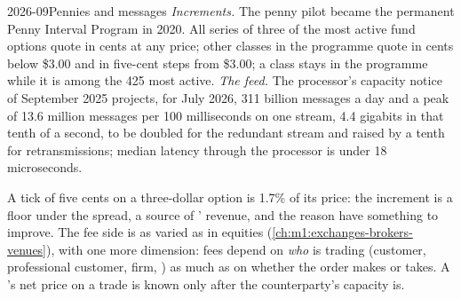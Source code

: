 \begin{dated}{2026-09}{Pennies and messages}\label{dat:m1:options-market-structure:penny}
\emph{Increments.} The penny pilot became the permanent Penny Interval Program
in 2020. All series of three of the most active fund options quote in cents
at any price; other classes in the programme quote in cents below \$3.00 and
in five-cent steps from \$3.00; a class stays in the programme while it is
among the 425 most active. \emph{The feed.} The processor's capacity notice of
September 2025 projects, for July 2026, 311 billion messages a day and a peak
of 13.6 million messages per 100 milliseconds on one stream, 4.4 gigabits in
that tenth of a second, to be doubled for the redundant stream and raised by
a tenth for retransmissions; median latency through the processor is under 18
microseconds.
\end{dated}

\begin{omfigure}

\label{fig:m1:options-market-structure:opra}
\end{omfigure}

A tick of five cents on a three-dollar option is 1.7\% of its price: the
increment is a floor under the spread, a source of ' revenue,
and the reason  have something to improve. The
fee side is as varied as in equities (\cref{ch:m1:exchanges-brokers-venues}),
with one more dimension: fees depend on \emph{who} is trading (customer,
professional customer, firm, ) as much as on whether the order
makes or takes. A 's net price on a trade is known only after the
counterparty's capacity is.

